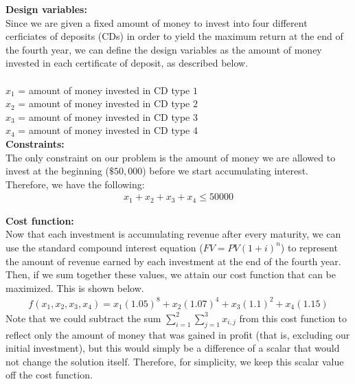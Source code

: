 \documentclass[11pt]{article}
\begin{document}
\begin{prob}{3}
\end{prob}

\begin{sol}

\textbf{Design variables:} \\ 
Since we are given a fixed amount of money to invest into four different cerficiates of deposits (CDs) in order to yield the maximum return at the end of the fourth year, we can define the design variables as the amount of money invested in each certificate of deposit, as described below.\\ \\ 
$x_{1}$ = amount of money invested in CD type $1$ \\
$x_{2}$ = amount of money invested in CD type $2$ \\
$x_{3}$ = amount of money invested in CD type $3$ \\
$x_{4}$ = amount of money invested in CD type $4$ \\

\textbf{Constraints:}  \\
The only constraint on our problem is the amount of money we are allowed to invest at the beginning ($\$50,000$) before we start accumulating interest. Therefore, we have the following:
\begin{eqnarray*}
x_{1} + x_{2} + x_{3} + x_{4} \leq 50000
\end{eqnarray*}

\textbf{Cost function:} \\
Now that each investment is accumulating revenue after every maturity, we can use the standard compound interest equation ($FV = PV(1+i)^{n}$) to represent the amount of revenue earned by each investment at the end of the fourth year. Then, if we sum together these values, we attain our cost function that can be maximized. This is shown below.
\begin{eqnarray*}
f(x_{1}, x_{2}, x_{3}, x_{4}) = x_{1}(1.05)^{8} + x_{2}(1.07)^{4} + x_{3}(1.1)^{2} + x_{4}(1.15)
\end{eqnarray*}
Note that we could subtract the sum $\sum_{i=1}^{2}\sum_{j=1}^{3}x_{i,j}$ from this cost function to reflect only the amount of money that was gained in profit (that is, excluding our initial investment), but this would simply be a difference of a scalar that would not change the solution itself. Therefore, for simplicity, we keep this scalar value off the cost function. \\


\end{sol}
\end{document}
